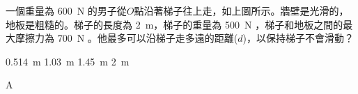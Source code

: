 

{
     \par\bigskip
    一個重量為 \qty{600}{N} 的男子從$O$點沿著梯子往上走，如上圖所示。牆壁是光滑的，地板是粗糙的。梯子的長度為 \qty{2}{m}，梯子的重量為 \qty{500}{N} ，梯子和地板之間的最大摩擦力為 \qty{700}{N} 。他最多可以沿梯子走多遠的距離($d$)，以保持梯子不會滑動？
    \begin{tasks}
        \task \qty{0.514}{m}
        \task \qty{1.03}{m}
        \task \qty{1.45}{m}
        \task \qty{2}{m}
    \end{tasks}

}{A}


